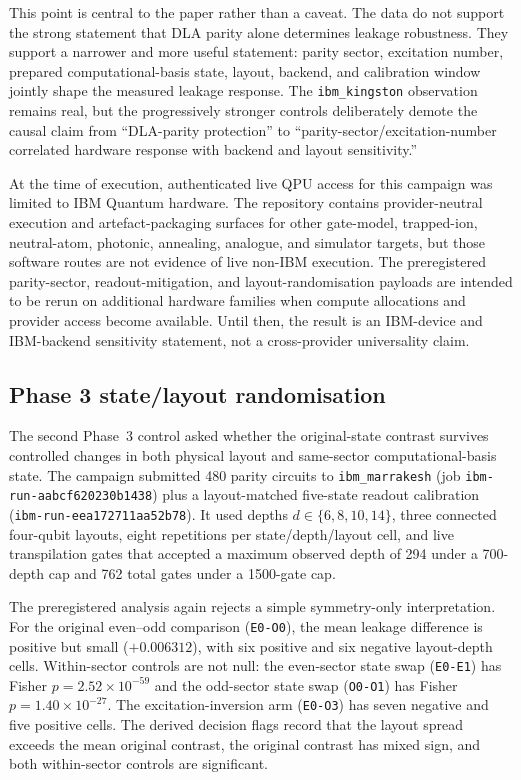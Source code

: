 \documentclass[reprint,aps,physrev,superscriptaddress,floatfix,longbibliography]{revtex4-2}
\begin{document}
This point is central to the paper rather than a caveat. The data do not
support the strong statement that DLA parity alone determines leakage
robustness. They support a narrower and more useful statement: parity sector,
excitation number, prepared computational-basis state, layout, backend, and
calibration window jointly shape the measured leakage response. The
\texttt{ibm\_kingston} observation remains real, but the progressively stronger
controls deliberately demote the causal claim from ``DLA-parity protection''
to ``parity-sector/excitation-number correlated hardware response with
backend and layout sensitivity.''

At the time of execution, authenticated live QPU access for this campaign was
limited to IBM Quantum hardware. The repository contains provider-neutral
execution and artefact-packaging surfaces for other gate-model, trapped-ion,
neutral-atom, photonic, annealing, analogue, and simulator targets, but those
software routes are not evidence of live non-IBM execution. The preregistered
parity-sector, readout-mitigation, and layout-randomisation payloads are
intended to be rerun on additional hardware families when compute allocations
and provider access become available. Until then, the result is an IBM-device
and IBM-backend sensitivity statement, not a cross-provider universality claim.

\subsection{Phase 3 state/layout randomisation}
\label{sec:phase3layout}

The second Phase~3 control asked whether the original-state contrast
survives controlled changes in both physical layout and same-sector
computational-basis state. The campaign submitted 480 parity circuits
to \texttt{ibm\_marrakesh} (job \texttt{ibm-run-aabcf620230b1438}) plus a
layout-matched five-state readout calibration
(\texttt{ibm-run-eea172711aa52b78}). It used depths
$d\in\{6,8,10,14\}$, three connected four-qubit layouts, eight
repetitions per state/depth/layout cell, and live transpilation gates
that accepted a maximum observed depth of 294 under a 700-depth cap
and 762 total gates under a 1500-gate cap.

The preregistered analysis again rejects a simple symmetry-only
interpretation. For the original even--odd comparison
(\texttt{E0-O0}), the mean leakage difference is positive but small
($+0.006312$), with six positive and six negative layout-depth cells.
Within-sector controls are not null: the even-sector state swap
(\texttt{E0-E1}) has Fisher $p=2.52\times10^{-59}$ and the odd-sector
state swap (\texttt{O0-O1}) has Fisher $p=1.40\times10^{-27}$. The
excitation-inversion arm (\texttt{E0-O3}) has seven negative and five
positive cells. The derived decision flags record that the layout
spread exceeds the mean original contrast, the original contrast has
mixed sign, and both within-sector controls are significant.
\end{document}
